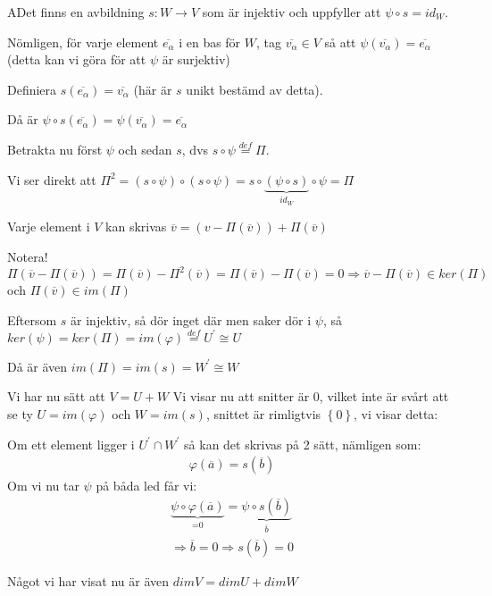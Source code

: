 \begin{prf}
  ADet finns en avbildning $s:W\to V$ som är injektiv och uppfyller att $\psi\circ s = id_W$. \par
  \noindent Nömligen, för varje element $\overline{e_{\alpha}}$ i en bas för $W$, tag $\overline{v_{\alpha}}\in V$ så att $\psi(\overline{v_{\alpha}}) = \overline{e_{\alpha}}$ (detta kan vi göra för att $\psi$ är surjektiv)
  \par\bigskip
  \noindent Definiera $s(\overline{e_{\alpha}}) = \overline{v_{\alpha}}$ (här är $s$ unikt bestämd av detta).\par
  \noindent Då är $\psi\circ s(\overline{e_{\alpha}}) = \psi(\overline{v_{\alpha}}) = \overline{e_{\alpha}}$
  \par\bigskip
  \noindent Betrakta nu först $\psi$ och sedan $s$, dvs $s\circ\psi\stackrel{def}{=}\Pi$.\par
  \noindent Vi ser direkt att $\Pi^2 = (s\circ\psi)\circ(s\circ\psi) = s\circ\underbrace{(\psi\circ s)}_{\text{$id_W$}}\circ\psi = \Pi$
  \par\bigskip
  \noindent Varje element i $V$ kan skrivas $\overline{v} = (v-\Pi(\overline{v}))+\Pi(\overline{v})$
  \par\bigskip
  \noindent Notera! $\Pi(\overline{v}-\Pi(\overline{v})) = \Pi(\overline{v})-\Pi^2(\overline{v}) =\Pi(\overline{v})-\Pi(\overline{v})=0\Rightarrow \overline{v}-\Pi(\overline{v})\in ker(\Pi)$ och $\Pi(\overline{v})\in im(\Pi)$
  \par\bigskip
  \noindent Eftersom $s$ är injektiv, så dör inget där men saker dör i $\psi$, så $ker(\psi) = ker(\Pi) = im(\varphi)\stackrel{def}{=}U^{\prime}\cong U$ 
  \par\bigskip
  \noindent Då är även $im(\Pi) = im(s) = W^{\prime}\cong W$
  \par\bigskip
  \noindent Vi har nu sätt att $V = U+W$ Vi visar nu att snitter är 0, vilket inte är svårt att se ty $U = im(\varphi)$ och $W=im(s)$, snittet är rimligtvis $\left\{0\right\}$, vi visar detta:
  \par\bigskip
  \noindent Om ett element ligger i $U^{\prime}\cap W^{\prime}$ så kan det skrivas på 2 sätt, nämligen som:
  \begin{equation*}
    \begin{gathered}
      \varphi(\overline{a}) = s(\overline{b})
    \end{gathered}
  \end{equation*}
  \noindent Om vi nu tar $\psi$ på båda led får vi:
  \begin{equation*}
    \begin{gathered}
      \underbrace{\psi\circ\varphi(\overline{a})}_{\text{=0}} = \underbrace{\psi\circ s(\overline{b})}_{\text{$\overline{b}$}}\\
      \Rightarrow\overline{b} = 0\Rightarrow s(\overline{b}) = 0
    \end{gathered}
  \end{equation*}
  \par\bigskip
  \noindent Något vi har visat nu är även $dim V = dim U + dim W$
\end{prf}
